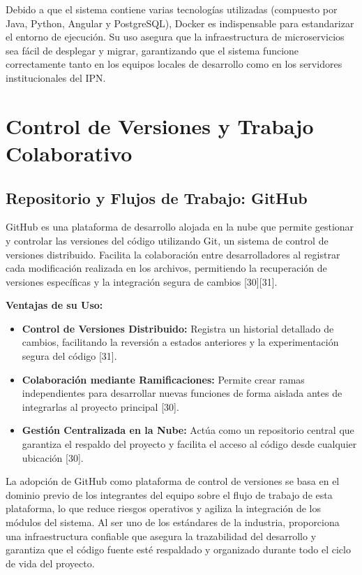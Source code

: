 Debido a que el sistema contiene varias tecnologías utilizadas (compuesto por Java, Python, Angular y PostgreSQL), Docker es indispensable para estandarizar el entorno de ejecución. Su uso asegura que la infraestructura de microservicios sea fácil de desplegar y migrar, garantizando que el sistema funcione correctamente tanto en los equipos locales de desarrollo como en los servidores institucionales del IPN.

\section{Control de Versiones y Trabajo Colaborativo}
\subsection{Repositorio y Flujos de Trabajo: GitHub}
GitHub es una plataforma de desarrollo alojada en la nube que permite gestionar y controlar las versiones del código utilizando Git, un sistema de control de versiones distribuido. Facilita la colaboración entre desarrolladores al registrar cada modificación realizada en los archivos, permitiendo la recuperación de versiones específicas y la integración segura de cambios [30][31].

\textbf{Ventajas de su Uso:}
\begin{itemize}
    \item \textbf{Control de Versiones Distribuido:} Registra un historial detallado de cambios, facilitando la reversión a estados anteriores y la experimentación segura del código [31].
    \item \textbf{Colaboración mediante Ramificaciones:} Permite crear ramas independientes para desarrollar nuevas funciones de forma aislada antes de integrarlas al proyecto principal [30].
    \item \textbf{Gestión Centralizada en la Nube:} Actúa como un repositorio central que garantiza el respaldo del proyecto y facilita el acceso al código desde cualquier ubicación [30].
\end{itemize}

La adopción de GitHub como plataforma de control de versiones se basa en el dominio previo de los integrantes del equipo sobre el flujo de trabajo de esta plataforma, lo que reduce riesgos operativos y agiliza la integración de los módulos del sistema. Al ser uno de los estándares de la industria, proporciona una infraestructura confiable que asegura la trazabilidad del desarrollo y garantiza que el código fuente esté respaldado y organizado durante todo el ciclo de vida del proyecto.
